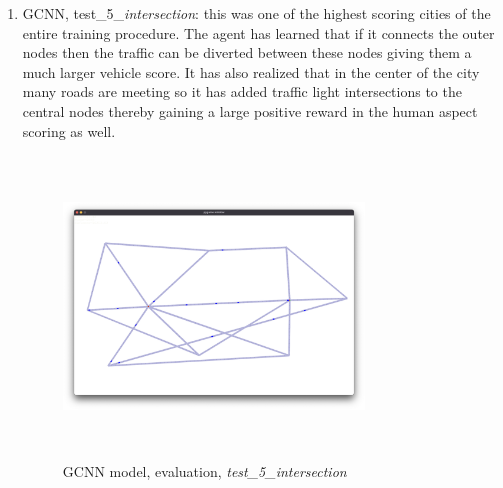 \documentclass[
]{elteikthesis}[2023/04/10]
\begin{document}
\begin{enumerate}
\item GCNN, test\_5\_\emph{intersection}: this was one of the highest scoring
cities of the entire training procedure. The agent has learned that
if it connects the outer nodes then the traffic can be diverted between
these nodes giving them a much larger vehicle score. It has also realized
that in the center of the city many roads are meeting so it has added
traffic light intersections to the central nodes thereby gaining a
large positive reward in the human aspect scoring as well. 
\begin{figure}[H]
\begin{centering}
\includegraphics[width=8cm,height=8cm,keepaspectratio]{images/city_agent_gcnn_2023-05-03_23-33_test_5_intersection}
\par\end{centering}
\caption{GCNN model, evaluation, \emph{test\_5\_intersection}}


\end{figure}
\end{enumerate}
\end{document}
